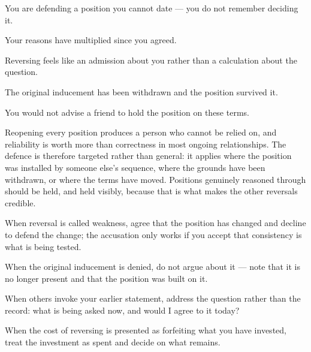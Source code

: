\begin{feedback}
  \item You are defending a position you cannot date --- you do not remember deciding it.
  \item Your reasons have multiplied since you agreed.
  \item Reversing feels like an admission about you rather than a calculation about the question.
  \item The original inducement has been withdrawn and the position survived it.
  \item You would not advise a friend to hold the position on these terms.
\end{feedback}

\begin{failure}
Reopening every position produces a person who cannot be relied on, and reliability is worth more than correctness in most ongoing relationships. The defence is therefore targeted rather than general: it applies where the position was installed by someone else's sequence, where the grounds have been withdrawn, or where the terms have moved. Positions genuinely reasoned through should be held, and held visibly, because that is what makes the other reversals credible.
\end{failure}

\begin{countermeasures}
  \item When reversal is called weakness, agree that the position has changed and decline to defend the change; the accusation only works if you accept that consistency is what is being tested.
  \item When the original inducement is denied, do not argue about it --- note that it is no longer present and that the position was built on it.
  \item When others invoke your earlier statement, address the question rather than the record: what is being asked now, and would I agree to it today?
  \item When the cost of reversing is presented as forfeiting what you have invested, treat the investment as spent and decide on what remains.
\end{countermeasures}

\seesources
{}
